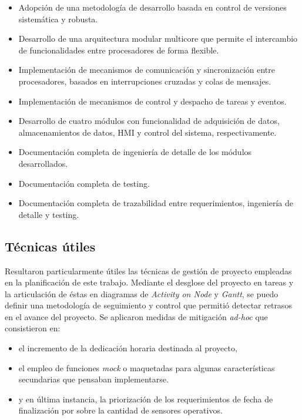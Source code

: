 \begin{itemize}
	\item Adopción de una metodología de desarrollo basada en control de versiones sistemática y robusta.
	\item Desarrollo de una arquitectura modular multicore que permite el intercambio de funcionalidades entre procesadores de forma flexible.
	\item Implementación de mecanismos de comunicación y sincronización entre procesadores, basados en interrupciones cruzadas y colas de mensajes.
	\item Implementación de mecanismos de control y despacho de tareas y eventos.
	\item Desarrollo de cuatro módulos con funcionalidad de adquisición de datos, almacenamientos de datos, HMI y control del sistema, respectivamente. 
	\item Documentación completa de ingeniería de detalle de los módulos desarrollados.
	\item Documentación completa de testing.
	\item Documentación completa de trazabilidad entre requerimientos, ingeniería de detalle y testing.
\end{itemize} 

\subsection{Técnicas útiles}
\label{subsec:tecnicas_utiles}

Resultaron particularmente útiles las técnicas de gestión de proyecto empleadas en la planificación de este trabajo.  Mediante el desglose del proyecto en tareas y la articulación de éstas en diagramas de \textit{Activity on Node} y \textit{Gantt}, se puedo definir una metodología de seguimiento y control que permitió detectar retrasos en el avance del proyecto. Se aplicaron medidas de mitigación \textit{ad-hoc} que consistieron en:

\begin{itemize}
	\item el incremento de la dedicación horaria destinada al proyecto,
	\item el empleo de funciones \textit{mock} o maquetadas para algunas características secundarias que pensaban implementarse.
	\item y en última instancia, la priorización de los requerimientos de fecha de finalización por sobre la cantidad de sensores operativos.
\end{itemize}  


